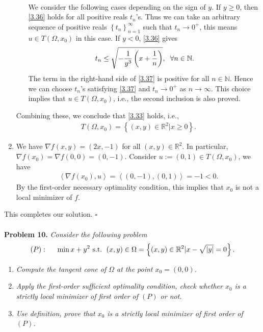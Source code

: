 \documentclass[a4paper]{article}
\numberwithin{equation}{section}
\begin{document}
\begin{enumerate}
\begin{enumerate}
\begin{align}
\end{align}
We consider the following cases depending on the sign of $y$. If $y\ge0$, then \eqref{3.36} holds for all positive reals $t_n$'s. Thus we can take an arbitrary sequence of positive reals $\left\{ {{t_n}} \right\}_{n = 1}^\infty $ such that $t_n\to 0^+$, this means $u\in T\left(\Omega,x_0\right)$ in this case. If $y<0$, \eqref{3.36} gives
\begin{align}
\label{3.37}
{t_n} \le \sqrt { - \frac{1}{{{y^3}}}\left( {x + \frac{1}{n}} \right)} ,\hspace{0.2cm}\forall n \in \mathbb{N}.
\end{align}
The term in the right-hand side of \eqref{3.37} is positive for all $n\in \mathbb{N}$. Hence we can choose $t_n$'s satisfying \eqref{3.37} and $t_n\to 0^+$ as $n\to \infty$. This choice implies that $u\in T\left(\Omega,x_0\right)$, i.e., the second inclusion is also proved.
\end{enumerate}
Combining these, we conclude that \eqref{3.33} holds, i.e.,
\begin{align}
T\left( {\Omega ,{x_0}} \right) = \left\{ {\left( {x,y} \right) \in {\mathbb{R}^2}|x \ge 0} \right\}.
\end{align}
\item We have $\nabla f\left( {x,y} \right) = \left( {2x, - 1} \right)$ for all $\left(x,y\right)\in \mathbb{R}^2$. In particular, $\nabla f\left( {{x_0}} \right) = \nabla f\left( {0,0} \right) = \left( {0, - 1} \right)$. Consider $u:=\left(0,1\right)\in T\left(\Omega,x_0\right)$, we have
\begin{align}
\left\langle {\nabla f\left( {{x_0}} \right),u} \right\rangle  = \left\langle {\left( {0, - 1} \right),\left( {0,1} \right)} \right\rangle  =  - 1 < 0.
\end{align}
By the first-order necessary optimality condition, this implies that $x_0$ is not a local minimizer of $f$. 
\end{enumerate}
This completes our solution. \hfill $\square$\\
\\
\textbf{Problem 10.} \textit{Consider the following problem}
\begin{align}
\left( P \right):\hspace{0.5cm}\min x+y^2 \mbox{ s.t. } \left( {x,y} \right) \in \Omega  = \left\{ {\left( {x,y} \right) \in {\mathbb{R}^2}|x - \sqrt {\left| y \right|}  = 0} \right\}.
\end{align}
\begin{enumerate}
\item \textit{Compute the tangent cone of $\Omega$ at the point $x_0=\left(0,0\right)$.}
\item \textit{Apply the first-order sufficient optimality condition, check whether $x_0$ is a strictly local minimizer of first order of $\left(P\right)$ or not.}
\item \textit{Use definition, prove that $x_0$ is a strictly local minimizer of first order of $\left(P\right)$.}
\end{enumerate}
\end{document}
